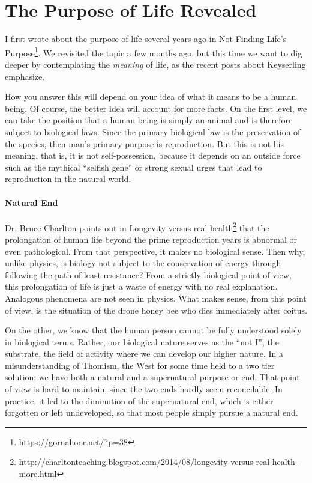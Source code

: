 \section{The Purpose of Life Revealed}

I first wrote about the purpose of life several years ago in Not Finding Life's Purpose\footnote{\url{https://gornahoor.net/?p=38}}. We revisited the topic a few months ago, but this time we want to dig deeper by contemplating the \emph{meaning} of life, as the recent posts about Keyserling emphasize.

How you answer this will depend on your idea of what it means to be a human being. Of course, the better idea will account for more facts. On the first level, we can take the position that a human being is simply an animal and is therefore subject to biological laws. Since the primary biological law is the preservation of the species, then man's primary purpose is reproduction. But this is not his meaning, that is, it is not self-possession, because it depends on an outside force such as the mythical ``selfish gene'' or strong sexual urges that lead to reproduction in the natural world.

\paragraph{Natural End}


Dr. Bruce Charlton points out in Longevity versus real health\footnote{\url{http://charltonteaching.blogspot.com/2014/08/longevity-versus-real-health-more.html}} that the prolongation of human life beyond the prime reproduction years is abnormal or even pathological. From that perspective, it makes no biological sense. Then why, unlike physics, is biology not subject to the conservation of energy through following the path of least resistance? From a strictly biological point of view, this prolongation of life is just a waste of energy with no real explanation. Analogous phenomena are not seen in physics. What makes sense, from this point of view, is the situation of the drone honey bee who dies immediately after coitus.

On the other, we know that the human person cannot be fully understood solely in biological terms. Rather, our biological nature serves as the ``not I'', the substrate, the field of activity where we can develop our higher nature. In a misunderstanding of Thomism, the West for some time held to a two tier solution: we have both a natural and a supernatural purpose or end. That point of view is hard to maintain, since the two ends hardly seem reconcilable. In practice, it led to the diminution of the supernatural end, which is either forgotten or left undeveloped, so that most people simply pursue a natural end.

